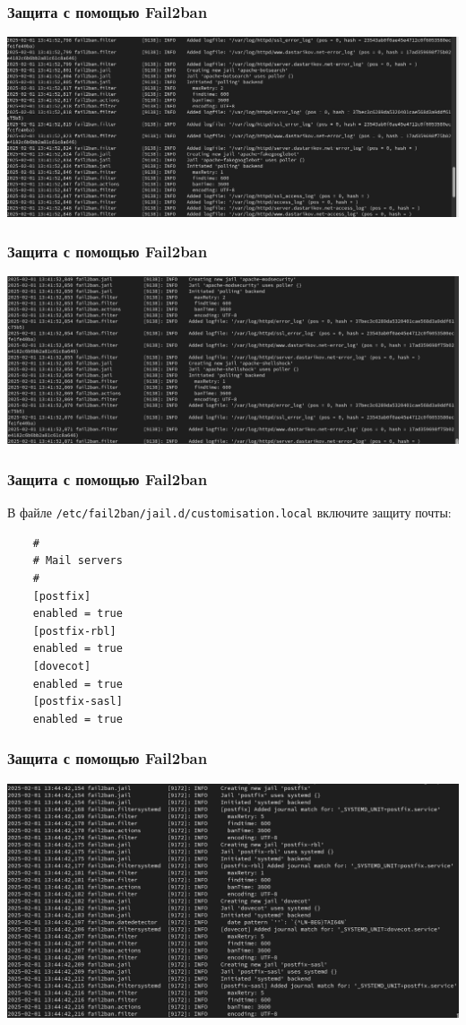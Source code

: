 \begin{frame}
\frametitle{Защита с помощью Fail2ban}
    \centering
    \includegraphics[width=\textwidth]{../images/image05.png}
\end{frame}

\begin{frame}
\frametitle{Защита с помощью Fail2ban}
    \centering
    \includegraphics[width=\textwidth]{../images/image06.png}
\end{frame}

\begin{frame}[fragile]
\frametitle{Защита с помощью Fail2ban}
В файле {\tt /etc/fail2ban/jail.d/customisation.local} включите защиту почты:
\begin{verbatim}
    #
    # Mail servers
    #
    [postfix]
    enabled = true
    [postfix-rbl]
    enabled = true
    [dovecot]
    enabled = true
    [postfix-sasl]
    enabled = true
\end{verbatim}
\end{frame}

\begin{frame}
\frametitle{Защита с помощью Fail2ban}
  \centering
  \includegraphics[width=\textwidth]{../images/image08.png}
\end{frame}


